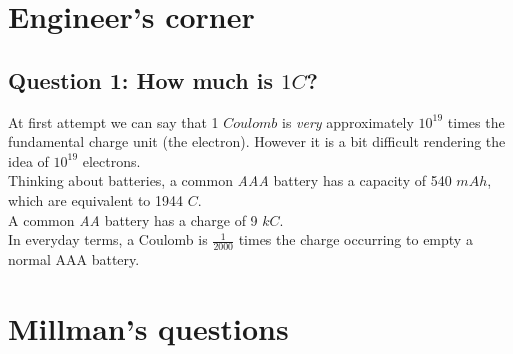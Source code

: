 \documentclass[12pt]{article}
\newcommand{\I}{\textit}
\begin{document}
\newpage
\section{Engineer's corner}
\subsection*{Question 1: How much is $1 C$?} 
At first attempt we can say that 1 $Coulomb$ is \I{very} approximately $10^{19}$ times the fundamental charge unit (the electron). However it is a bit difficult rendering the idea of $10^{19}$ electrons. \\
Thinking about batteries, a common \I{AAA} battery has a capacity of 540 $mAh$, which are equivalent to 1944 $C$. \\
A common \I{AA} battery has a charge of 9 $kC$. \\
In everyday terms, a Coulomb is $\frac{1}{2000}$ times the charge occurring to empty a normal AAA battery.


\newpage
\section{Millman's questions}
\end{document}
